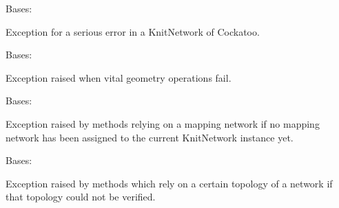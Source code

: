 \documentclass[letterpaper,10pt,english]{sphinxmanual}
\begin{document}

\begin{fulllineitems}
\label{\detokenize{cockatoo:cockatoo.exception.KnitNetworkError}}
Bases: {\hyperref[\detokenize{cockatoo:cockatoo.exception.CockatooException}]{}}

Exception for a serious error in a KnitNetwork of Cockatoo.

\end{fulllineitems}


\begin{fulllineitems}
\label{\detokenize{cockatoo:cockatoo.exception.KnitNetworkGeometryError}}
Bases: {\hyperref[\detokenize{cockatoo:cockatoo.exception.KnitNetworkError}]{}}

Exception raised when vital geometry operations fail.

\end{fulllineitems}


\begin{fulllineitems}
\label{\detokenize{cockatoo:cockatoo.exception.MappingNetworkError}}
Bases: {\hyperref[\detokenize{cockatoo:cockatoo.exception.KnitNetworkError}]{}}

Exception raised by methods relying on a mapping network if no mapping
network has been assigned to the current KnitNetwork instance yet.

\end{fulllineitems}


\begin{fulllineitems}
\label{\detokenize{cockatoo:cockatoo.exception.KnitNetworkTopologyError}}
Bases: {\hyperref[\detokenize{cockatoo:cockatoo.exception.KnitNetworkError}]{}}

Exception raised by methods which rely on a certain topology of a network if
that topology could not be verified.

\end{fulllineitems}
\end{document}
